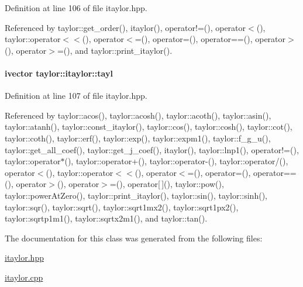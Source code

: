 \-Definition at line 106 of file itaylor.\-hpp.



\-Referenced by taylor\-::get\-\_\-order(), itaylor(), operator!=(), operator$<$(), taylor\-::operator$<$$<$(), operator$<$=(), operator=(), operator==(), operator$>$(), operator$>$=(), and taylor\-::print\-\_\-itaylor().

\hypertarget{classtaylor_1_1itaylor_a4df835280789a8639aed81fe83b272f8}{
\paragraph[{tayl}]{\setlength{\rightskip}{0pt plus 5cm}ivector {\bf taylor\-::itaylor\-::tayl}}}\label{classtaylor_1_1itaylor_a4df835280789a8639aed81fe83b272f8}


\-Definition at line 107 of file itaylor.\-hpp.



\-Referenced by taylor\-::acos(), taylor\-::acosh(), taylor\-::acoth(), taylor\-::asin(), taylor\-::atanh(), taylor\-::const\-\_\-itaylor(), taylor\-::cos(), taylor\-::cosh(), taylor\-::cot(), taylor\-::coth(), taylor\-::erf(), taylor\-::exp(), taylor\-::expm1(), taylor\-::f\-\_\-g\-\_\-u(), taylor\-::get\-\_\-all\-\_\-coef(), taylor\-::get\-\_\-j\-\_\-coef(), itaylor(), taylor\-::lnp1(), operator!=(), taylor\-::operator$\ast$(), taylor\-::operator+(), taylor\-::operator-\/(), taylor\-::operator/(), operator$<$(), taylor\-::operator$<$$<$(), operator$<$=(), operator=(), operator==(), operator$>$(), operator$>$=(), operator\mbox{[}$\,$\mbox{]}(), taylor\-::pow(), taylor\-::power\-At\-Zero(), taylor\-::print\-\_\-itaylor(), taylor\-::sin(), taylor\-::sinh(), taylor\-::sqr(), taylor\-::sqrt(), taylor\-::sqrt1mx2(), taylor\-::sqrt1px2(), taylor\-::sqrtp1m1(), taylor\-::sqrtx2m1(), and taylor\-::tan().



\-The documentation for this class was generated from the following files\-:\begin{DoxyCompactItemize}
\item 
\hyperlink{itaylor_8hpp}{itaylor.\-hpp}\item 
\hyperlink{itaylor_8cpp}{itaylor.\-cpp}\end{DoxyCompactItemize}

